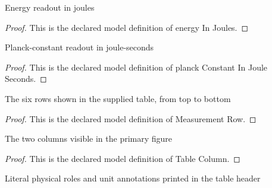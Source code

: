 \begin{definition}
  \label{def:physics:phyx-mini-0516:phyxminiproblems-problemphyxmini0516-energyinjoules}
  Energy readout in joules
\end{definition}
\begin{proof}
  This is the declared model definition of energy In Joules.
\end{proof}
\begin{definition}
  \label{def:physics:phyx-mini-0516:phyxminiproblems-problemphyxmini0516-planckconstantinjouleseconds}
  Planck-constant readout in joule-seconds
\end{definition}
\begin{proof}
  This is the declared model definition of planck Constant In Joule Seconds.
\end{proof}
\begin{definition}
  \label{def:physics:phyx-mini-0516:phyxminiproblems-problemphyxmini0516-measurementrow}
  The six rows shown in the supplied table, from top to bottom
\end{definition}
\begin{proof}
  This is the declared model definition of Measurement Row.
\end{proof}
\begin{definition}
  \label{def:physics:phyx-mini-0516:phyxminiproblems-problemphyxmini0516-tablecolumn}
  The two columns visible in the primary figure
\end{definition}
\begin{proof}
  This is the declared model definition of Table Column.
\end{proof}
\begin{definition}
  \label{def:physics:phyx-mini-0516:phyxminiproblems-problemphyxmini0516-tablecolumnlabel}
  Literal physical roles and unit annotations printed in the table header
\end{definition}

